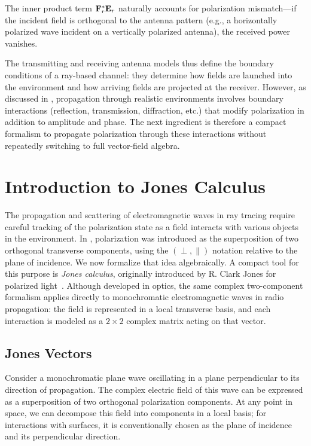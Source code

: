 The inner product term $\mathbf{F}_{r}^{*} \mathbf{E}_{r}$ naturally accounts for polarization mismatch---if the incident field is orthogonal to the antenna pattern (e.g., a horizontally polarized wave incident on a vertically polarized antenna), the received power vanishes.

The transmitting and receiving antenna models thus define the boundary conditions of a ray-based channel: they determine how fields are launched into the environment and how arriving fields are projected at the receiver. However, as discussed in , propagation through realistic environments involves boundary interactions (reflection, transmission, diffraction, etc.) that modify polarization in addition to amplitude and phase. The next ingredient is therefore a compact formalism to propagate polarization through these interactions without repeatedly switching to full vector-field algebra.

\section{Introduction to Jones Calculus}

The propagation and scattering of electromagnetic waves in ray tracing require careful tracking of the polarization state as a field interacts with various objects in the environment. In , polarization was introduced as the superposition of two orthogonal transverse components, using the $(\perp,\parallel)$ notation relative to the plane of incidence. We now formalize that idea algebraically. A compact tool for this purpose is \emph{Jones calculus}, originally introduced by R. Clark Jones for polarized light~. Although developed in optics, the same complex two-component formalism applies directly to monochromatic electromagnetic waves in radio propagation: the field is represented in a local transverse basis, and each interaction is modeled as a $2\times2$ complex matrix acting on that vector.

\subsection{Jones Vectors}

Consider a monochromatic plane wave oscillating in a plane perpendicular to its direction of propagation. The complex electric field of this wave can be expressed as a superposition of two orthogonal polarization components. At any point in space, we can decompose this field into components in a local basis; for interactions with surfaces, it is conventionally chosen as the plane of incidence and its perpendicular direction.


